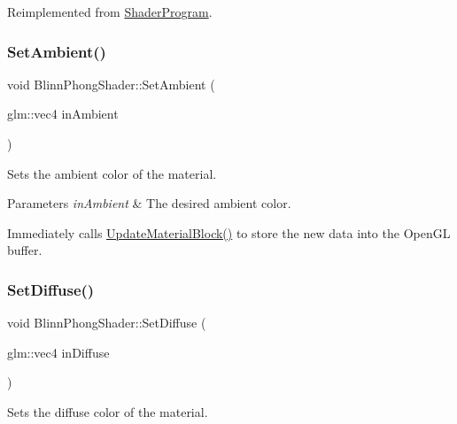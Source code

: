 Reimplemented from \hyperlink{class_shader_program_a51ac6fbf3a3d88643eef303a4c3a1fa8}{Shader\+Program}.

\hypertarget{class_blinn_phong_shader_a0f8c1c478525dd662922597ea7d9c4ac}{}\label{class_blinn_phong_shader_a0f8c1c478525dd662922597ea7d9c4ac}
\subsubsection{\texorpdfstring{Set\+Ambient()}{SetAmbient()}}
{\footnotesize\ttfamily void Blinn\+Phong\+Shader\+::\+Set\+Ambient (\begin{DoxyParamCaption}\item[{glm\+::vec4}]{in\+Ambient }\end{DoxyParamCaption})\hspace{0.3cm}{\ttfamily [virtual]}}



Sets the ambient color of the material.


\begin{DoxyParams}{Parameters}
{\em in\+Ambient} & The desired ambient color.\\
\hline
\end{DoxyParams}
Immediately calls \hyperlink{class_blinn_phong_shader_aa247270120b46431b436220ea6e777be}{Update\+Material\+Block()} to store the new data into the Open\+GL buffer. \hypertarget{class_blinn_phong_shader_a610957f435f1ef817e7d2c4350e55181}{}\label{class_blinn_phong_shader_a610957f435f1ef817e7d2c4350e55181}
\subsubsection{\texorpdfstring{Set\+Diffuse()}{SetDiffuse()}}
{\footnotesize\ttfamily void Blinn\+Phong\+Shader\+::\+Set\+Diffuse (\begin{DoxyParamCaption}\item[{glm\+::vec4}]{in\+Diffuse }\end{DoxyParamCaption})\hspace{0.3cm}{\ttfamily [virtual]}}



Sets the diffuse color of the material.


